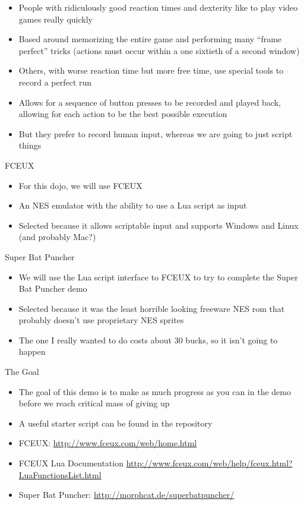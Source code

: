 \documentclass{beamer}
\begin{document}
\begin{frame}{}
	\begin{itemize}
		\item People with ridiculously good reaction times and dexterity like to play video games really quickly
		\item Based around memorizing the entire game and performing many ``frame perfect'' tricks (actions must occur within a one sixtieth of a second window)
		\item Others, with worse reaction time but more free time, use special tools to record a perfect run
		\item Allows for a sequence of button presses to be recorded and played back, allowing for each action to be the best possible execution
		\item But they prefer to record human input, whereas we are going to just script things
	\end{itemize}
\end{frame}


\begin{frame}{FCEUX}
	\begin{itemize}
		\item For this dojo, we will use FCEUX
		\item An NES emulator with the ability to use a Lua script as input
		\item Selected because it allows scriptable input and supports Windows and Linux (and probably Mac?)
	\end{itemize}
\end{frame}

\begin{frame}{Super Bat Puncher}
	\begin{itemize}
		\item We will use the Lua script interface to FCEUX to try to complete the Super Bat Puncher demo
		\item Selected because it was the least horrible looking freeware NES rom that probably doesn't use proprietary NES sprites
		\item The one I really wanted to do costs about 30 bucks, so it isn't going to happen
	\end{itemize}
\end{frame}

\begin{frame}{The Goal}
	\begin{itemize}
		\item The goal of this demo is to make as much progress as you can in the demo before we reach critical mass of giving up
		\item A useful starter script can be found in the repository
		\item FCEUX: \url{http://www.fceux.com/web/home.html} 
		\item FCEUX Lua Documentation \url{http://www.fceux.com/web/help/fceux.html?LuaFunctionsList.html}
		\item Super Bat Puncher: \url{http://morphcat.de/superbatpuncher/}
	\end{itemize}
\end{frame}
\end{document}
